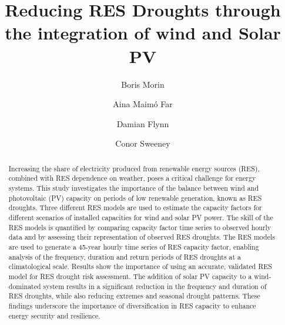 \documentclass[preprint, 12pt]{elsarticle}
\begin{document}
\begin{frontmatter}
	

\title{Reducing RES Droughts through the integration of wind and Solar PV}

\author[Math]{Boris Morin }

\author[Math]{Aina Maimó Far}

\author[Eng]{Damian Flynn}

\author[Math]{Conor Sweeney}




\begin{abstract}
Increasing the share of electricity produced from renewable energy sources (RES), combined with RES dependence on weather, poses a critical challenge for energy systems. This study investigates the importance of the balance between wind and photovoltaic (PV) capacity on periods of low renewable generation, known as RES droughts. Three different RES models are used to estimate the capacity factors for different scenarios of installed capacities for wind and solar PV power. The skill of the RES models is quantified by comparing capacity factor time series to observed hourly data and by assessing their representation of observed RES droughts. The RES models are used to generate a 45-year hourly time series of RES capacity factor, enabling analysis of the frequency, duration and return periods of RES droughts at a climatological scale. Results show the importance of using an accurate, validated RES model for RES drought risk assessment. The addition of solar PV capacity to a wind-dominated system results in a significant reduction in the frequency and duration of RES droughts, while also reducing extremes and seasonal drought patterns. These findings underscore the importance of diversification in RES capacity to enhance energy security and resilience.
\end{abstract}


\end{frontmatter}
\end{document}
